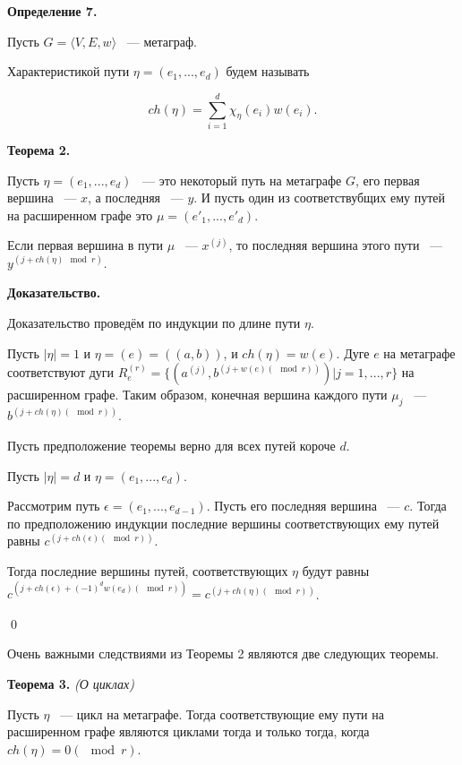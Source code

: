 \documentclass[14pt]{mmcs-article}
\begin{document}

\textbf{Определение 7.}

Пусть $G = \langle V, E, w \rangle$ ~--- метаграф.

Характеристикой пути $\eta = (e_1, ..., e_d)$ будем называть

\[
    ch(\eta) = \sum_{i = 1}^d \chi_{\eta}(e_i) w(e_i).
\]

\textbf{Теорема 2.}

Пусть  $\eta = (e_1, ..., e_d)$ ~--- это некоторый путь на метаграфе $G$, его первая вершина ~--- $x$, а последняя ~--- $y$. И пусть один из соответствубщих ему путей на расширенном графе это $\mu = (e'_1, ..., e'_d)$.

Если первая вершина в пути $\mu$ ~--- $x^{(j)}$, то последняя вершина этого пути ~--- $y^{(j + ch(\eta)\mod{r})}$.

\textbf{Доказательство.}


Доказательство проведём по индукции по длине пути $\eta$.

Пусть $|\eta| = 1$ и  $\eta = (e) = ((a,b))$, и $ch(\eta) = w(e)$. Дуге $e$ на метаграфе соответствуют дуги $R^{(r)}_e = \{ (a^{(j)}, b^{(j + w(e) (\mod{r}))} ) | j = 1, ..., r \}$
на расширенном графе. Таким образом, конечная вершина каждого пути $\mu_j$ ~--- $b^{(j + ch(\eta) (\mod{r}))}$.

Пусть предположение теоремы верно для всех путей короче $d$.

Пусть $|\eta| = d$ и $\eta = (e_1, ..., e_d)$.

Рассмотрим путь $\epsilon = (e_1, ..., e_{d-1})$. Пусть его последняя вершина ~--- $c$. Тогда по предположению индукции последние вершины соответствующих ему путей равны $c^{(j + ch(\epsilon) (\mod{r}))}$.

Тогда последние вершины путей, соответствующих $\eta$ будут равны $c^{(j + ch(\epsilon) + (-1)^d w(e_d) (\mod{r}))} = c^{(j + ch(\eta) (\mod{r}))}$.

\qed

Очень важными следствиями из Теоремы 2 являются две следующих теоремы.

\textbf{Теорема 3.} \textsl{(О циклах)}

Пусть $\eta$ ~--- цикл на метаграфе. Тогда соответствующие ему пути на расширенном графе являются циклами тогда и только тогда, когда $ch(\eta) = 0 (\mod{r})$.
\end{document}
